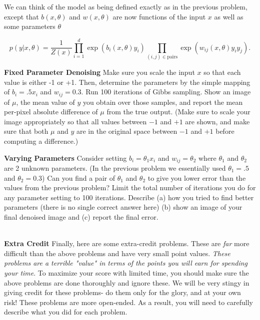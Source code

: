 \documentclass[11pt]{article}
\begin{document}
We can think of the model as being defined exactly as in the previous problem, except that $b(x,\theta)$ and $w(x,\theta)$ are now functions of the input $x$ as well as some parameters $\theta$

\[ p(y \vert x, \theta) = \frac{1}{Z(x)} \prod_{i=1}^d \exp( b_i(x,\theta ) y_i ) \prod_{(i,j)\in \text{pairs}} \exp(w_{ij}(x,\theta ) y_i y_j). \]


\begin{problem}{10} \textbf{Fixed Parameter Denoising}
Make sure you scale the input $x$ so that each value is either -1 or +1. Then, determine the parameters by the simple mapping of $b_i = .5 x_i$ and $w_{ij}=0.3$. Run 100 iterations of Gibbs sampling. Show an image of $\mu$, the mean value of $y$ you obtain over those samples, and report the mean per-pixel absolute difference of $\mu$ from the true output. (Make sure to scale your image appropriately so that all values between $-1$ and $+1$ are shown, and make sure that both $\mu$ and $y$ are in the original space between $-1$ and $+1$ before computing a difference.)
\end{problem}

\begin{problem}{10} \textbf{Varying Parameters}
Consider setting $b_i = \theta_1 x_i$ and $w_{ij} = \theta_2$ where $\theta_1$ and $\theta_2$ are 2 unknown parameters. (In the previous problem we essentially used $\theta_1 = .5$ and $\theta_2 = 0.3$) Can you find a pair of $\theta_1$ and $\theta_2$ to give you lower error than the values from the previous problem? Limit the total number of iterations you do for any parameter setting to 100 iterations. Describe (a) how you tried to find better parameters (there is no single correct answer here) (b) show an image of your final denoised image and (c) report the final error.
\end{problem}
\\


{\bf Extra Credit} Finally, here are some extra-credit problems. These are \emph{far} more difficult than the above problems and have very small point values. \emph{These problems are a terrible "value" in terms of the points you will earn for spending your time}. To maximize your score with limited time, you should make sure the above problems are done thoroughly and ignore these.  We will be very stingy in giving credit for these problems- do them only for the glory, and at your own risk! These problems are more open-ended. As a result, you will need to carefully describe what you did for each problem.
\end{document}

